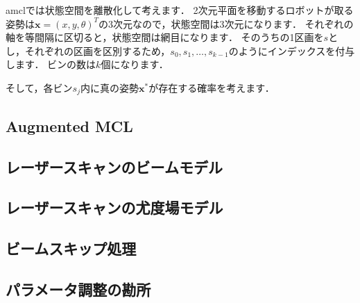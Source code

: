 \documentclass[{../../master}]{subfiles}
\begin{document}
\textsf{amcl}では状態空間を離散化して考えます．
2次元平面を移動するロボットが取る姿勢は$\bm{x} = (x, y, \theta)^T$の3次元なので，状態空間は3次元になります．
それぞれの軸を等間隔に区切ると，状態空間は網目になります．
そのうちの1区画を$s$とし，それぞれの区画を区別するため，$s_0, s_1, \ldots, s_{k-1}$のようにインデックスを付与します．
ビンの数は$k$個になります．

そして，各ビン$s_j$内に真の姿勢$\bm{x}^*$が存在する確率を考えます．

\subsection{Augmented MCL}

\subsection{レーザースキャンのビームモデル}

\subsection{レーザースキャンの尤度場モデル}

\subsection{ビームスキップ処理}

\subsection{パラメータ調整の勘所}
\end{document}

